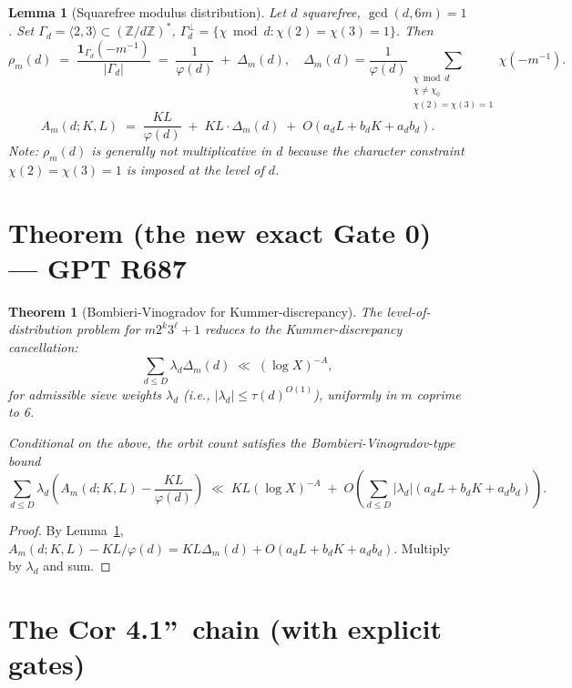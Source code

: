 \documentclass[12pt]{amsart}
\newtheorem{lemma}{Lemma}
\newtheorem{theorem}{Theorem}
\theoremstyle{definition}
\theoremstyle{remark}
\begin{document}
\begin{lemma}[Squarefree modulus distribution]\label{lem:R686}
Let $d$ squarefree, $\gcd(d, 6m) = 1$. Set $\Gamma_d = \langle 2, 3 \rangle \subset (\mathbb{Z}/d\mathbb{Z})^*$,
$\Gamma_d^\perp = \{\chi \bmod d : \chi(2) = \chi(3) = 1\}$. Then
$$
\rho_m(d)
\;=\;
\frac{\mathbf{1}_{\Gamma_d}(-m^{-1})}{|\Gamma_d|}
\;=\;
\frac{1}{\varphi(d)}
\;+\;
\Delta_m(d),
\quad
\Delta_m(d) = \frac{1}{\varphi(d)}
\sum_{\substack{\chi \bmod d \\ \chi \ne \chi_0 \\ \chi(2) = \chi(3) = 1}}
\chi(-m^{-1}).
$$
$$
A_m(d; K, L)
\;=\;
\frac{KL}{\varphi(d)}
\;+\;
KL \cdot \Delta_m(d)
\;+\;
O(a_d L + b_d K + a_d b_d).
$$
Note: $\rho_m(d)$ is generally not multiplicative in $d$ because the character constraint
$\chi(2) = \chi(3) = 1$ is imposed at the level of $d$.
\end{lemma}

\section{Theorem (the new exact Gate 0) --- GPT R687}

\begin{theorem}[Bombieri-Vinogradov for Kummer-discrepancy]\label{thm:BV-Kummer}
The level-of-distribution problem for $m 2^k 3^\ell + 1$ reduces to the
Kummer-discrepancy cancellation:
$$
\sum_{d \le D} \lambda_d \Delta_m(d)
\;\ll\;
(\log X)^{-A},
$$
for admissible sieve weights $\lambda_d$ (i.e., $|\lambda_d| \le \tau(d)^{O(1)}$),
uniformly in $m$ coprime to 6.

Conditional on the above, the orbit count satisfies the Bombieri-Vinogradov-type bound
$$
\sum_{d \le D} \lambda_d \left( A_m(d; K, L) - \frac{KL}{\varphi(d)} \right)
\;\ll\;
KL (\log X)^{-A}
\;+\;
O\!\left( \sum_{d \le D} |\lambda_d| (a_d L + b_d K + a_d b_d) \right).
$$
\end{theorem}

\begin{proof}
By Lemma~\ref{lem:R686},
$A_m(d; K, L) - KL/\varphi(d) = KL \Delta_m(d) + O(a_d L + b_d K + a_d b_d)$. Multiply by $\lambda_d$ and sum.
\end{proof}

\section{The Cor 4.1\textquotedblright\ chain (with explicit gates)}
\end{document}

